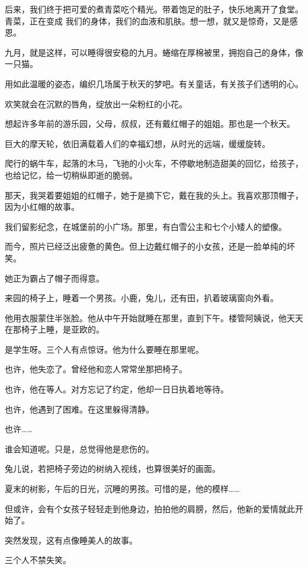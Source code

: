 		后来，我们终于把可爱的煮青菜吃个精光。带着饱足的肚子，快乐地离开了食堂。青菜，正在变成
	我们的身体，我们的血液和肌肤。想一想，就又是惊奇，又是感恩。

	\endwriting




		九月，就是这样，可以睡得很安稳的九月。蜷缩在厚棉被里，拥抱自己的身体，像一只猫。\par
		用如此温暖的姿态，编织几场属于秋天的梦吧。有关童话，有关孩子们透明的心。\par
		欢笑就会在沉默的唇角，绽放出一朵粉红的小花。\par
		想起许多年前的游乐园，父母，叔叔，还有戴红帽子的姐姐。那也是一个秋天。\par
		巨大的摩天轮，依旧满载着人们的幸福幻想，从时光的远端，缓缓旋转。\par
		爬行的蜗牛车，起落的木马，飞驰的小火车，不停歇地制造甜美的回忆，给孩子，也给记忆，给一切稍纵即逝的脆弱。\par
		那天，我哭着要姐姐的红帽子，她于是摘下它，戴在我的头上。我喜欢那顶帽子，因为小红帽的故事。\par
		我们留影纪念，在城堡前的小广场。那里，有白雪公主和七个小矮人的塑像。\par
		而今，照片已经泛出疲惫的黄色。但上边戴红帽子的小女孩，还是一脸单纯的坏笑。\par
		她正为霸占了帽子而得意。


		来园的椅子上，睡着一个男孩。小鹿，兔儿，还有田，扒着玻璃窗向外看。\par
		他用衣服蒙住半张脸。他从中午开始就睡在那里，直到下午。楼管阿姨说，他天天在那椅子上睡，是亚欧的。\par
		是学生呀。三个人有点惊讶。他为什么要睡在那里呢。\par
		也许，他失恋了。曾经他和恋人常常坐那把椅子。\par
		也许，他在等人。对方忘记了约定，他却一日日执着地等待。\par
		也许，他遇到了困难。在这里躲得清静。\par
		也许……\par
		谁会知道呢。只是，总觉得他是悲伤的。\par
		兔儿说，若把椅子旁边的树纳入视线，也算很美好的画面。\par
		夏末的树影，午后的日光，沉睡的男孩。可惜的是，他的模样……\par
		但或许，会有个女孩子轻轻走到他身边，拍拍他的肩膀，然后，他新的爱情就此开始了。\par
		突然发现，这有点像睡美人的故事。\par
		三个人不禁失笑。


